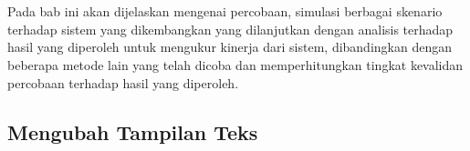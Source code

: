 \chapter{\babLima}
Pada bab ini akan dijelaskan mengenai percobaan, simulasi berbagai skenario
terhadap sistem yang dikembangkan yang dilanjutkan dengan analisis terhadap
hasil yang diperoleh untuk mengukur kinerja dari sistem, dibandingkan dengan
beberapa metode lain yang telah dicoba dan memperhitungkan tingkat kevalidan
percobaan terhadap hasil yang diperoleh.


\section{Mengubah Tampilan Teks}
